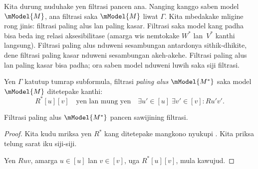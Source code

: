 \documentclass[../../../include/open-logic-section]{subfiles}
\begin{document}


Kita durung nuduhake yen filtrasi pancen ana. Nanging kanggo saben
model $\mModel{M}$, ana filtrasi saka $\mModel{M}$ liwat
$\Gamma$. Kita mbedakake mligine rong jinis: filtrasi paling alus lan
paling kasar. Filtrasi saka model kang padha bisa beda ing relasi
aksesibilitase (amarga  wis nemtokake
$W^*$ lan~$V^*$ kanthi langsung). Filtrasi paling alus nduweni
sesambungan antardonya sithik-dhikite, dene filtrasi paling kasar
nduweni sesambungan akeh-akehe. Filtrasi paling alus lan paling kasar bisa padha; ora saben model nduweni luwih saka siji filtrasi.

\begin{defn}
  Yen $\Gamma$ katutup tumrap subformula, filtrasi \emph{paling alus}
  $\mModel{M^*}$ saka model $\mModel{M}$ ditetepake kanthi:
  \[
  R^*[u][v] \quad \text{yen lan mung yen} \quad \exists u'\in [u] \;
  \exists v' \in [v] : Ru'v'.
  \]
\end{defn}

\begin{prop}
  Filtrasi paling alus $\mModel{M^*}$ pancen sawijining filtrasi.
\end{prop}

\begin{proof}
  Kita kudu mriksa yen $R^*$ kang ditetepake mangkono nyukupi
  .
  Kita priksa telung sarat iku siji-siji.

  Yen $Ruv$, amarga $u \in [u]$ lan $v \in [v]$, uga $R^*[u][v]$,
  mula  kawujud.
  
  
\end{proof}
\end{document}
